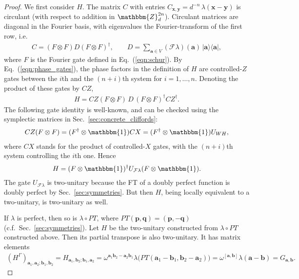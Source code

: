 \documentclass[aps,nofootinbib,floatfix,a4paper]{revtex4}
\newcommand{\1}{\mbox{$\mathbf{1}$}}
\def\ZZ{\mathbbm{Z}}
\def\F{\mathcal{F}}
\def\Id{\mathbbm{1}}
\renewcommand{\vec}{\mathbf}
\begin{document}
\begin{proof}
	We first consider $H$.
	The matrix $C$ with entries $C_{\vec x, \vec y}=d^{-n} \, \lambda(\vec x - \vec y)$ is circulant (with respect to addition in $\ZZ_d^{2n}$). 
	Circulant matrices are diagonal in the Fourier basis, with eigenvalues the Fourier-transform of the first row, i.e.\
	\begin{align*}
		C = (F\otimes F) D (F \otimes F)^\dagger,
		\qquad
		D = \sum_{\vec a\in V} (\F \lambda)(\vec a)\,|\vec a\rangle\langle \vec a|,
	\end{align*}
	where $F$ is the Fourier gate defined in Eq.~(\ref{eqn:schur}).
	By Eq.~(\ref{eqn:phase_gates}), the phase factors in the definition of $H$ are controlled-$Z$ gates between the $i$th and the $(n+i)$th system for $i=1, \dots, n$.
	Denoting the product of these gates by $CZ$,
	\begin{align*}
		H = 
		CZ
			(F\otimes F)\, D \, (F\otimes F)^\dagger 
			CZ^\dagger.
	\end{align*}
	The following gate identity is well-known, and can be checked using the symplectic matrices in Sec.~\ref{sec:concrete_cliffords}:
	\begin{align*}
		CZ (F\otimes F) 
		=
		(F^\dagger\otimes\Id)
		CX
		=
		(F^\dagger\otimes\Id) U_{WH},
	\end{align*}
	where $CX$ stands for the product of controlled-$X$ gates, with the $(n+i)$th system controlling the $i$th one.
	Hence
	\begin{align}\label{eqn:diag_h}
		H = 
		(F\otimes\Id)^\dagger
		U_{\F \lambda} 
		(F\otimes\Id).
	\end{align}
	The gate $U_{\F\lambda}$ is two-unitary because the FT of a doubly perfect function is doubly perfect by Sec.~\ref{sec:symmetries}.
	But then $H$, being locally equivalent to a two-unitary, is two-unitary as well.

	If $\lambda$ is perfect, then so is $\lambda \circ PT$, where 
	$PT(\vec p, \vec q) = (\vec p, -\vec q)$ (c.f.\ Sec.~\ref{sec:symmetries}).
	Let $H$ be the two-unitary constructed from $\lambda \circ PT$ constructed above.
	Then its partial transpose is also two-unitary.
	It has matrix elements
	\begin{align*}
		(H^\Gamma)_{\vec a_1,\vec a_2;\vec b_1,\vec b_2}
		=
		H_{\vec a_1,\vec b_2;\vec b_1,\vec a_2}
		=
		\omega^{\vec a_1 \vec b_2 - \vec a_2 \vec b_1} \lambda\big(PT(\vec a_1-\vec b_1, \vec b_2-\vec a_2) \big)
		=
		\omega^{[\vec a, \vec b]} \lambda(\vec a - \vec b)=G_{\vec a, \vec b}.
	\end{align*}
\end{proof}
\end{document}
